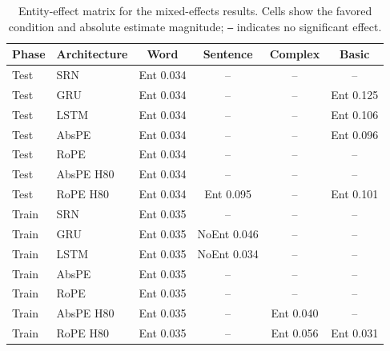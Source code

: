 \begin{table}[t]
\centering\scriptsize
\begin{tabular}{@{}llcccc@{}}
\toprule
\textbf{Phase} & \textbf{Architecture} & \textbf{Word} & \textbf{Sentence} & \textbf{Complex} & \textbf{Basic} \\
\midrule
Test & SRN & Ent 0.034 & -- & -- & -- \\
Test & GRU & Ent 0.034 & -- & -- & Ent 0.125 \\
Test & LSTM & Ent 0.034 & -- & -- & Ent 0.106 \\
Test & AbsPE & Ent 0.034 & -- & -- & Ent 0.096 \\
Test & RoPE & Ent 0.034 & -- & -- & -- \\
Test & AbsPE H80 & Ent 0.034 & -- & -- & -- \\
Test & RoPE H80 & Ent 0.034 & Ent 0.095 & -- & Ent 0.101 \\
Train & SRN & Ent 0.035 & -- & -- & -- \\
Train & GRU & Ent 0.035 & NoEnt 0.046 & -- & -- \\
Train & LSTM & Ent 0.035 & NoEnt 0.034 & -- & -- \\
Train & AbsPE & Ent 0.035 & -- & -- & -- \\
Train & RoPE & Ent 0.035 & -- & -- & -- \\
Train & AbsPE H80 & Ent 0.035 & -- & Ent 0.040 & -- \\
Train & RoPE H80 & Ent 0.035 & -- & Ent 0.056 & Ent 0.031 \\
\bottomrule
\end{tabular}
\caption{\small Entity-effect matrix for the mixed-effects results. Cells show the favored condition and absolute estimate magnitude; \texttt{--} indicates no significant effect.}
\label{tab:mixed_effects_entity_matrix}
\end{table}
